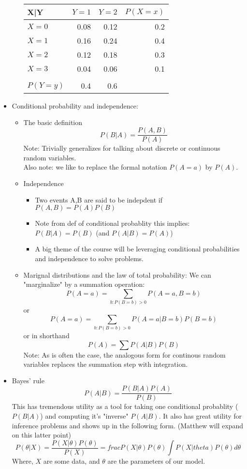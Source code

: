 \documentclass[10pt,containsverbatim,paralist]{article}
\begin{document}
\begin{itemize}
\begin{itemize}
\begin{center}
\begin{tabular}{lrrr}
\hline
X|Y & $Y=1$ & $Y=2$ & $P(X=x)$\\
\hline
$X=0$ & 0.08 & 0.12 & 0.2\\
$X=1$ & 0.16 & 0.24 & 0.4\\
$X=2$ & 0.12 & 0.18 & 0.3\\
$X=3$ & 0.04 & 0.06 & 0.1\\
 &  &  & \\
\hline
$P(Y=y)$ & 0.4 & 0.6 & \\
\hline
\end{tabular}
\end{center}
\end{itemize}
\item Conditional probability and independence:
\label{sec-1-1-3-3}
\begin{itemize}
\item The basic definition
\label{sec-1-1-3-3-1}
$$P(B|A) = \frac{P(A,B)}{P(A)}$$
Note: Trivially generalizes for talking about discrete or continuous random variables.\\
Also note: we like to replace the formal notation $P(A=a)$ by $P(A)$. 
\item Independence
\label{sec-1-1-3-3-2}
\begin{itemize}
\item Two events A,B are said to be indepdent if $P(A,B)=P(A)P(B)$
\item Note from def of conditional probablity this implies: $P(B|A)=P(B)$ (and $P(A|B)=P(A)$)
\item A big theme of the course will be leveraging conditional probabilities and
independence to solve problems.
\end{itemize}
\item Marignal distributions and the law of total probability:
\label{sec-1-1-3-3-3}
We can "marginalize" by a summation operation:
$$P(A=a)= \sum_{b:P(B=b)>0} P(A=a,B=b)$$ or $$P(A=a)=\sum_{b:P(B=b)>0}
P(A=a|B=b)P(B=b)$$ or in shorthand $$P(A)=\sum P(A|B)P(B)$$
Note: As is often the case, the analogous form for continous random variables
replaces the summation step with integration.
\end{itemize}
\item Bayes' rule
\label{sec-1-1-3-4}
$$P(A|B)=\frac{P(B|A)P(A)}{P(B)}$$
This has tremendous utility as a tool for taking one conditional probablity
($P(B|A)$) and computing it's "inverse" $P(A|B)$.  It also has great utility for
inference problems and shows up in the following form.  (Matthew will expand on this latter point)
$$P(\theta|X)=\frac{P(X|\theta)P(\theta)}{P(X)}=frac{P(X|\theta)P(\theta)}{\int P(X|theta)P(\theta)d\theta} $$
Where, $X$ are some data, and $\theta$ are the parameters of our model.
\end{itemize}
\end{document}
